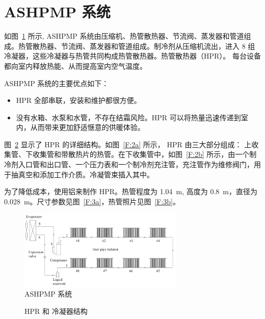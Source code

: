 \section{ASHPMP 系统}
如图~\ref{F:1} 所示, ASHPMP 系统由压缩机、热管散热器、节流阀、蒸发器和管道组成。热管散热器、节流阀、蒸发器和管道组成。制冷剂从压缩机流出，进入 8 组冷凝器，这些冷凝器与热管共同构成热管散热器。热管散热器（HPR）。
每台设备都向室内释放热能、从而提高室内空气温度。

ASHPMP 系统的主要优点如下：
\begin{itemize}
    \item HPR 全部串联，安装和维护都很方便。
    \item 没有水箱、水泵和水管，不存在结霜风险。HPR 可以将热量迅速传递到室内，从而带来更加舒适惬意的供暖体验。
\end{itemize}

图~\ref{F:2} 显示了 HPR 的详细结构。如图~\ref{F:2a} 所示， HPR 由三大部分组成： 上收集管、下收集管和带散热片的热管。在下收集管中，如图~\ref{F:2b} 所示，由一个制冷剂入口管和出口管、一个压力表和一个制冷剂充注管，充注管作为维修阀门，用于抽真空和添加工作介质。冷凝管束插入其中。

为了降低成本，使用铝来制作 HPR。热管程度为 \qty{1.04}{m}, 高度为 \qty{0.8}{m}，直径为 \qty{0.028}{m}。尺寸参数见图~\ref{F:3a}，热管照片见图~\ref{F:3b}。

\begin{figure}[htbp]
	\centering
	\includegraphics[width=0.7\textwidth]{picture/picture_1}
	\caption{ASHPMP 系统}
	\label{F:1}
\end{figure}

\begin{figure}[htbp]
\centering  %

\caption{HPR 和 冷凝器结构}
\label{F:2}
\end{figure}

